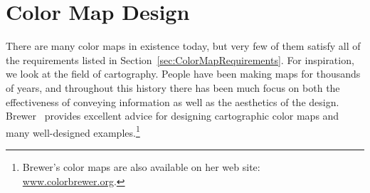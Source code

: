 \documentclass{llncs}
\begin{document}

\section{Color Map Design}
\label{sec:ColorMapDesign}

There are many color maps in existence today, but very few of them satisfy
all of the requirements listed in Section~\ref{sec:ColorMapRequirements}.
For inspiration, we look at the field of cartography.  People
have been making maps for thousands of years, and throughout this history
there has been much focus on both the effectiveness of
conveying information as well as the aesthetics of the design.
Brewer~\cite{Brewer05} provides excellent advice for designing cartographic
color maps and many well-designed examples.\footnote{Brewer's color maps
are also available on her web site:
\href{http://www.colorbrewer.org}{www.colorbrewer.org}.}
\end{document}
